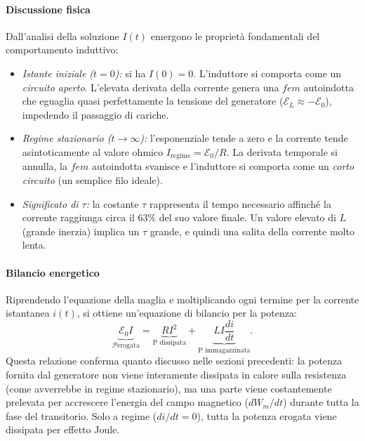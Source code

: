 \documentclass[a4paper,11pt]{report}
\begin{document}
\paragraph{Discussione fisica}
Dall'analisi della soluzione $I(t)$ emergono le proprietà fondamentali del comportamento induttivo:
\begin{itemize}
    \item \textit{Istante iniziale ($t=0$):} si ha $I(0) = 0$. L'induttore si comporta come un \textit{circuito aperto}. L'elevata derivata della corrente genera una $fem$ autoindotta che eguaglia quasi perfettamente la tensione del generatore ($\mathcal{E}_L \approx -\mathcal{E}_0$), impedendo il passaggio di cariche.
    \item \textit{Regime stazionario ($t \to \infty$):} l'esponenziale tende a zero e la corrente tende asintoticamente al valore ohmico $I_{\text{regime}} = \mathcal{E}_0/R$. La derivata temporale si annulla, la $fem$ autoindotta svanisce e l'induttore si comporta come un \textit{corto circuito} (un semplice filo ideale).
    \item \textit{Significato di $\tau$:} la costante $\tau$ rappresenta il tempo necessario affinché la corrente raggiunga circa il $63\%$ del suo valore finale. Un valore elevato di $L$ (grande inerzia) implica un $\tau$ grande, e quindi una salita della corrente molto lenta.
\end{itemize}

\paragraph{Bilancio energetico}
Riprendendo l'equazione della maglia e moltiplicando ogni termine per la corrente istantanea $i(t)$, si ottiene un'equazione di bilancio per la potenza:
\begin{equation}
\underbrace{\mathcal{E}_0 I}_{\mathcal{P} \text{erogata}} = \underbrace{R I^2}_{\text{P dissipata}} + \underbrace{L I \frac{di}{dt}}_{\text{P immagazzinata}}.
\end{equation}
Questa relazione conferma quanto discusso nelle sezioni precedenti: la potenza fornita dal generatore non viene interamente dissipata in calore sulla resistenza (come avverrebbe in regime stazionario), ma una parte viene costantemente prelevata per accrescere l'energia del campo magnetico ($dW_m/dt$) durante tutta la fase del transitorio. Solo a regime ($di/dt=0$), tutta la potenza erogata viene dissipata per effetto Joule.
\end{document}
